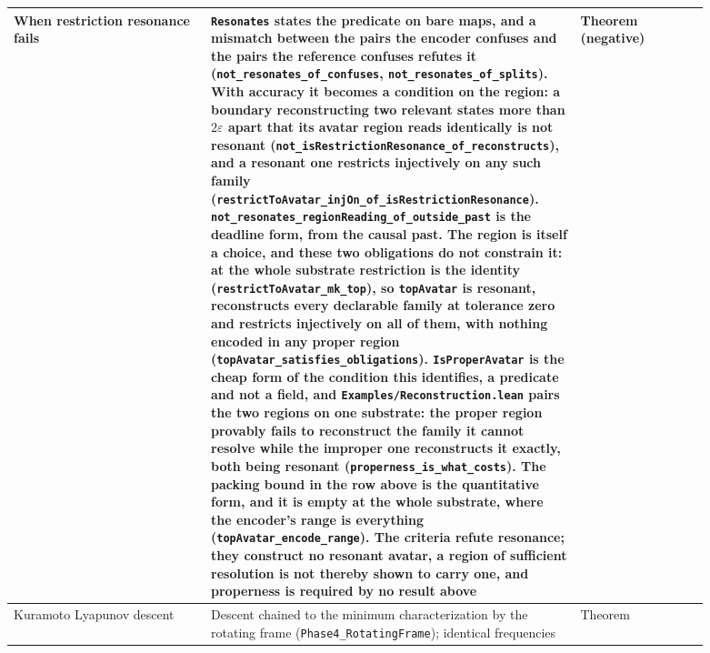 \documentclass{article}
\begin{document}
\begin{longtable}{|>{\raggedright\arraybackslash}p{0.26\linewidth}|>{\raggedright\arraybackslash}p{0.46\linewidth}|>{\raggedright\arraybackslash}p{0.17\linewidth}|}
When restriction resonance fails & \texttt{Resonates} states the predicate on bare maps, and a mismatch between the pairs the encoder confuses and the pairs the reference confuses refutes it (\nolinkurl{not_resonates_of_confuses}, \nolinkurl{not_resonates_of_splits}). With accuracy it becomes a condition on the region: a boundary reconstructing two relevant states more than $2\varepsilon$ apart that its avatar region reads identically is not resonant (\nolinkurl{not_isRestrictionResonance_of_reconstructs}), and a resonant one restricts injectively on any such family (\nolinkurl{restrictToAvatar_injOn_of_isRestrictionResonance}). \nolinkurl{not_resonates_regionReading_of_outside_past} is the deadline form, from the causal past. The region is itself a choice, and these two obligations do not constrain it: at the whole substrate restriction is the identity (\nolinkurl{restrictToAvatar_mk_top}), so \nolinkurl{topAvatar} is resonant, reconstructs every declarable family at tolerance zero and restricts injectively on all of them, with nothing encoded in any proper region (\nolinkurl{topAvatar_satisfies_obligations}). \nolinkurl{IsProperAvatar} is the cheap form of the condition this identifies, a predicate and not a field, and \nolinkurl{Examples/Reconstruction.lean} pairs the two regions on one substrate: the proper region provably fails to reconstruct the family it cannot resolve while the improper one reconstructs it exactly, both being resonant (\nolinkurl{properness_is_what_costs}). The packing bound in the row above is the quantitative form, and it is empty at the whole substrate, where the encoder's range is everything (\nolinkurl{topAvatar_encode_range}). The criteria refute resonance; they construct no resonant avatar, a region of sufficient resolution is not thereby shown to carry one, and properness is required by no result above & Theorem (negative) \\ \hline
Kuramoto Lyapunov descent & Descent chained to the minimum characterization by the rotating frame (\nolinkurl{Phase4_RotatingFrame}); identical frequencies & Theorem \\ \hline

\end{longtable}
\end{document}
